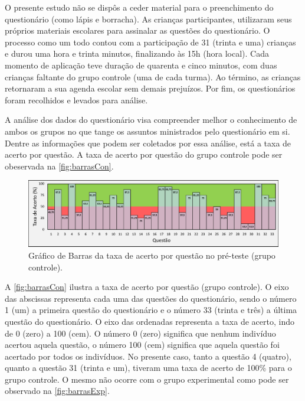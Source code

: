 O presente estudo não se dispôs a ceder material para o preenchimento do questionário (como lápis e borracha). As crianças participantes, utilizaram seus próprios materiais escolares para assinalar as questões do questionário. O processo como um todo contou com a participação de 31 (trinta e uma)  crianças e durou uma hora e trinta minutos, finalizando às 15h (hora local). Cada momento de aplicação teve duração de quarenta e cinco minutos, com duas crianças faltante do grupo controle (uma de cada turma). Ao término, as crianças retornaram a sua agenda escolar sem demais prejuízos. Por fim, os questionários foram recolhidos e levados para análise.

A análise dos dados do questionário visa compreender melhor o conhecimento de ambos os grupos no que tange os assuntos ministrados pelo questionário em si. Dentre as informações que podem ser coletados por essa análise, está a taxa de acerto por questão. A taxa de acerto por questão do grupo controle pode ser obeservada na \autoref{fig:barrasCon}.

\begin{figure}[htb]

    \caption{\label{fig:barrasCon}Gráfico de Barras da taxa de acerto por questão no pré-teste (grupo controle).}
    \includegraphics[width=\linewidth]{./Visuais/Notas4.pdf}
  
\end{figure}

A \autoref{fig:barrasCon} ilustra a taxa de acerto por questão (grupo controle). O eixo das abscissas representa cada uma das questões do questionário, sendo o número 1 (um) a primeira questão do questionário e o número 33 (trinta e três) a última questão do questionário. O eixo das ordenadas representa a taxa de acerto, indo de 0 (zero) a 100 (cem). O número 0 (zero) significa que nenhum indivíduo acertou aquela questão, o número 100 (cem) significa que aquela questão foi acertado por todos os indivíduos. No presente caso, tanto a questão 4 (quatro), quanto a questão 31 (trinta e um), tiveram uma taxa de acerto de 100\% para o grupo controle. O mesmo não ocorre com o grupo experimental como pode ser observado na \autoref{fig:barrasExp}.

